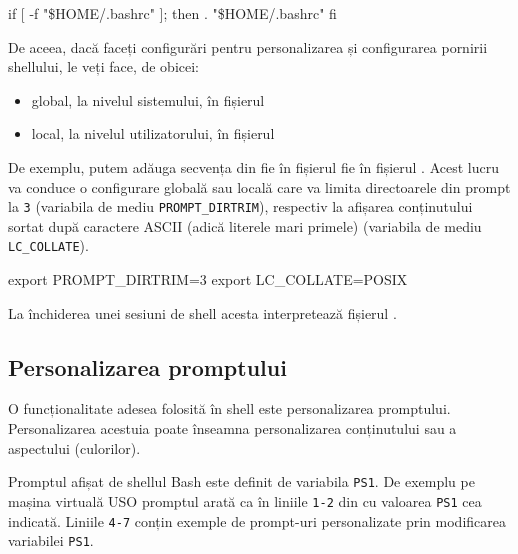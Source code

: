 \begin{screen}[caption={Secvență de configurare Bash (~/.bashrc)},label={lst:cli:home-profile}]
    if [ -f "\$HOME/.bashrc" ]; then
        . "\$HOME/.bashrc"
    fi
\end{screen}

De aceea, dacă faceți configurări pentru personalizarea și configurarea pornirii shellului, le veți face, de obicei:

\begin{itemize}
  \item global, la nivelul sistemului, în fișierul 
  \item local, la nivelul utilizatorului, în fișierul 
\end{itemize}

De exemplu, putem adăuga secvența din  fie în fișierul  fie în fișierul . Acest lucru va conduce o configurare globală sau locală care va limita directoarele din prompt la \texttt{3} (variabila de mediu \texttt{PROMPT\_DIRTRIM}), respectiv la afișarea conținutului sortat după caractere ASCII (adică literele mari primele) (variabila de mediu \texttt{LC\_COLLATE}).

\begin{screen}[caption={Configurare în Bash (bashrc)},label={lst:cli:config-bashrc}]
export PROMPT_DIRTRIM=3
export LC_COLLATE=POSIX
\end{screen}

La închiderea unei sesiuni de shell acesta interpretează fișierul .

\subsection{Personalizarea promptului}
\label{sec:cli:shell-start:prompt}

O funcționalitate adesea folosită în shell este personalizarea promptului.
Personalizarea acestuia poate înseamna personalizarea conținutului sau a
aspectului (culorilor).

Promptul afișat de shellul Bash este definit de variabila \texttt{PS1}. De exemplu pe
mașina virtuală USO promptul arată ca în liniile \texttt{1-2} din  cu valoarea \texttt{PS1} cea indicată. Liniile \texttt{4-7} conțin exemple de prompt-uri personalizate prin modificarea variabilei \texttt{PS1}.

